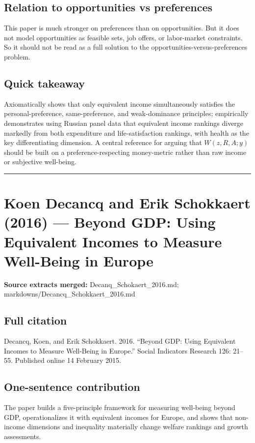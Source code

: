 \documentclass[11pt,a4paper]{article}
\begin{document}
\subsection*{Relation to opportunities vs preferences}
This paper is much stronger on preferences than on opportunities. But it does not model opportunities as feasible sets, job offers, or labor-market constraints. So it should not be read as a full solution to the opportunities-versus-preferences problem.

\subsection*{Quick takeaway}
Axiomatically shows that only equivalent income simultaneously satisfies the personal-preference, same-preference, and weak-dominance principles; empirically demonstrates using Russian panel data that equivalent income rankings diverge markedly from both expenditure and life-satisfaction rankings, with health as the key differentiating dimension. A central reference for arguing that $W(z,R,A;y)$ should be built on a preference-respecting money-metric rather than raw income or subjective well-being.


\medskip\hrule\medskip

\section*{Koen Decancq and Erik Schokkaert (2016) — Beyond GDP: Using Equivalent Incomes to Measure Well-Being in Europe}

\textbf{Source extracts merged:} Decanq\_Schokaert\_2016.md; markdowns/Decancq\_Schokkaert\_2016.md

\subsection*{Full citation}
Decancq, Koen, and Erik Schokkaert. 2016. “Beyond GDP: Using Equivalent Incomes to Measure Well-Being in Europe.” Social Indicators Research 126: 21–55. Published online 14 February 2015.

\subsection*{One-sentence contribution}
The paper builds a five-principle framework for measuring well-being beyond GDP, operationalizes it with equivalent incomes for Europe, and shows that non-income dimensions and inequality materially change welfare rankings and growth assessments.
\end{document}
